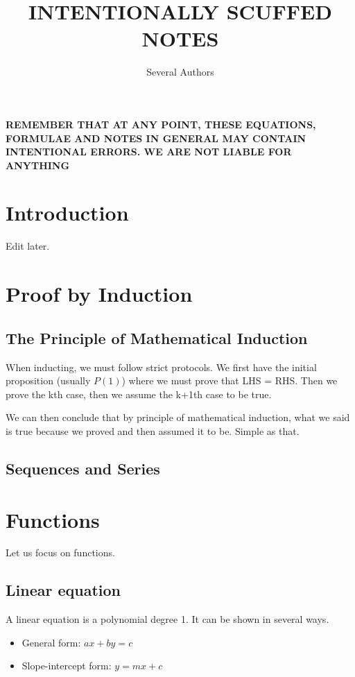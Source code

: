 \documentclass[a4paper]{article}
\theoremstyle{plain}
\theoremstyle{definition}
\theoremstyle{remark}
\newcommand{\sectionSpace}{\vspace{2em}} %
\newcommand{\subsectionSpace}{\vspace{0.5em}}
\begin{document}
\title{INTENTIONALLY SCUFFED NOTES}
\author{Several Authors}
\maketitle
\newpage

\begin{center}
    \Large 
    \textbf{
        REMEMBER THAT AT ANY POINT, THESE EQUATIONS, FORMULAE AND NOTES IN GENERAL MAY CONTAIN INTENTIONAL ERRORS. WE ARE NOT LIABLE FOR ANYTHING} 
\end{center}

\sectionSpace
\section{Introduction}
    Edit later.



\sectionSpace
\section{Proof by Induction}
    \subsection{The Principle of Mathematical Induction}
    When inducting, we must follow strict protocols. We first have the initial proposition (usually $P(1)$) where we must prove that LHS = RHS. Then we prove the kth case, then we assume the k+1th case to be true. 

    We can then conclude that by principle of mathematical induction, what we said is true because we proved and then assumed it to be. Simple as that.

    \subsectionSpace
    \subsection{Sequences and Series}



\sectionSpace
\section{Functions}
Let us focus on functions. 
    \subsection{Linear equation}
    A linear equation is a polynomial degree 1. It can be shown in several ways.
    \begin{itemize}
        \item General form: $ax + by = c$
        \item Slope-intercept form: $y = mx + c$
    \end{itemize}
\end{document}
